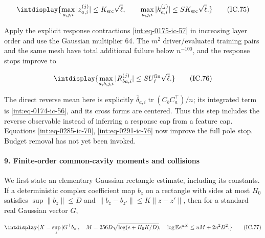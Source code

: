 \begingroup\renewcommand{\theHequation}{intdisplay.670}
\begin{equation}
\intdisplay{
\max_{a,j,i}|z_{a,i}^{(j)}|\le K_{\rm src}\sqrt\ell,
 \qquad\max_{a,j,i}|k_{a,i}^{(j)}|
                          \le SK_{\rm src}\sqrt\ell.
}
\tag{IC.75}
\label{int:eq-0290-ic-75}
\end{equation}
\endgroup


Apply the explicit response contractions \eqref{int:eq-0175-ic-57} in increasing layer order and use the Gaussian multiplier 64. The \(m^2\) driver/evaluated training pairs and the same mesh have total additional failure below \(n^{-100}\), and the response stops improve to


\begingroup\renewcommand{\theHequation}{intdisplay.671}
\begin{equation}
\intdisplay{
\max_{a,b,j,i}|R_{ba,i}^{(j)}|
                         \le S U_j^{\rm fin}\sqrt\ell.
}
\tag{IC.76}
\label{int:eq-0291-ic-76}
\end{equation}
\endgroup


The direct reverse mean here is explicitly \(\bar\delta_{a,\allowbreak i}\operatorname{tr}(C_bC_a^\top)/n\); its integrated term is \eqref{int:eq-0174-ic-56}, and its cross forms are centered. Thus this step includes the reverse observable instead of inferring a response cap from a feature cap. Equations \eqref{int:eq-0285-ic-70}, \eqref{int:eq-0291-ic-76} now improve the full pole stop. Budget removal has not yet been invoked.


\paragraph{9. Finite-order common-cavity moments and collisions}

\mbox{}\par\smallskip


We first state an elementary Gaussian rectangle estimate, including its constants. If a deterministic complex coefficient map \(b_z\) on a rectangle with sides at most \(H_0\) satisfies \(\sup\|b_z\|\le D\) and \(\|b_z-b_{z'}\|\le K\|z-z'\|\), then for a standard real Gaussian vector \(G\),


\begingroup\renewcommand{\theHequation}{intdisplay.672}
\begin{equation}
\intdisplay{
X=\sup_z|G^\top b_z|,\quad
 M=256D\sqrt{\log(e+H_0K/D)},\quad
 \log\mathbb E e^{uX}\le uM+2u^2D^2.
}
\tag{IC.77}
\label{int:eq-0292-ic-77}
\end{equation}
\endgroup

